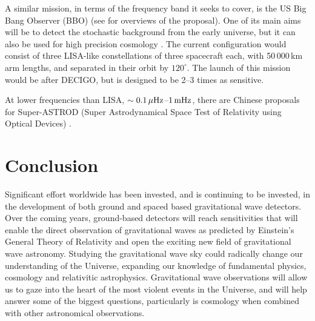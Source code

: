 \documentclass{article}
\begin{document}
A similar mission, in terms of the frequency band it seeks to cover, is the US
Big Bang Observer (BBO) (see \cite{Crowder:2005, Cutler:2009, Harry:2006} for
overviews of the proposal). One of its main aims will be to detect the
stochastic background from the early universe, but it can also be used for high
precision cosmology \cite{Cutler:2009}. The current configuration would consist
of three LISA-like constellations of three spacecraft each, with 50\,000\,km arm
lengths, and separated in their orbit by $120^{\circ}$. The launch of this
mission would be after DECIGO, but is designed to be 2--3 times as sensitive.

At lower frequencies than LISA, $\sim0.1\,\mu{\rm Hz}$--$1\,{\rm mHz}$, there
are Chinese proposals for Super-ASTROD (Super Astrodynamical Space Test of
Relativity using Optical Devices) \cite{Ni:2009}.


\newpage

\section{Conclusion}
\label{section:conclusion}

Significant effort worldwide has been invested, and is continuing to be invested, in the development
of both ground and spaced based gravitational wave detectors. Over the coming years, ground-based
detectors will reach sensitivities that will enable the direct observation of gravitational waves as predicted by Einstein's
General Theory of Relativity and open the exciting new field of gravitational wave astronomy. Studying the gravitational wave
sky could radically change our understanding of the Universe, expanding our knowledge of fundamental physics, cosmology and
relativitic astrophysics. Gravitational wave observations will allow us to gaze into the heart of the most violent events in the
Universe, and will help answer some of the biggest questions, particularly is cosmology when combined with other astronomical observations.



\end{document}
